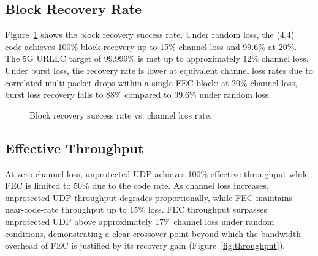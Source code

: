 \documentclass[conference]{IEEEtran}
\begin{document}
\subsection{Block Recovery Rate}

Figure~\ref{fig:recovery_rate} shows the block recovery success rate.
Under random loss, the (4,4) code achieves 100\% block recovery up to
15\% channel loss and 99.6\% at 20\%. The 5G URLLC target of 99.999\%
is met up to approximately 12\% channel loss. Under burst loss, the
recovery rate is lower at equivalent channel loss rates due to
correlated multi-packet drops within a single FEC block: at 20\% channel
loss, burst loss recovery falls to 88\% compared to 99.6\% under random
loss.

\begin{figure}[!t]
\centering
{}
\caption{Block recovery success rate vs. channel loss rate.}
\label{fig:recovery_rate}
\end{figure}

\subsection{Effective Throughput}

At zero channel loss, unprotected UDP achieves 100\% effective
throughput while FEC is limited to 50\% due to the code rate. As channel
loss increases, unprotected UDP throughput degrades proportionally, while
FEC maintains near-code-rate throughput up to 15\% loss. FEC throughput
surpasses unprotected UDP above approximately 17\% channel loss under
random conditions, demonstrating a clear crossover point beyond which the
bandwidth overhead of FEC is justified by its recovery gain
(Figure~\ref{fig:throughput}).
\end{document}
